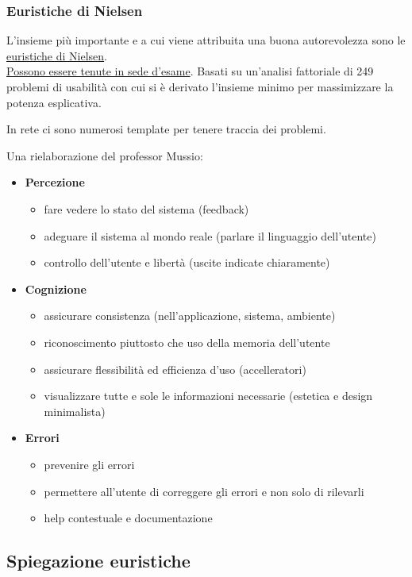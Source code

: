 \documentclass[11pt,a4paper]{book}
\begin{document}
\subsubsection{Euristiche di Nielsen}
L'insieme più importante e a cui viene attribuita una buona autorevolezza sono le \href{https://www.neurowebdesign.it/it/alla-scoperta-delle-10-euristiche-di-nielsen/}{euristiche di Nielsen}. \\\underline{Possono essere tenute in sede d'esame}.
Basati su un'analisi fattoriale di 249 problemi di usabilità con cui si è derivato l'insieme minimo per massimizzare la potenza esplicativa.

In rete ci sono numerosi template per tenere traccia dei problemi.

Una rielaborazione del professor Mussio:
\begin{itemize}
	\item[] \textbf{Percezione}
	\begin{itemize}
		\item fare vedere lo stato del sistema (feedback)
		\item adeguare il sistema al mondo reale (parlare il linguaggio dell'utente)
		\item controllo dell'utente e libertà (uscite indicate chiaramente)
	\end{itemize}
	\item[] \textbf{Cognizione}
	\begin{itemize}
		\item assicurare consistenza (nell'applicazione, sistema, ambiente)
		\item riconoscimento piuttosto che uso della memoria dell'utente
		\item assicurare flessibilità ed efficienza d'uso (accelleratori)
		\item visualizzare tutte e sole le informazioni necessarie (estetica e design minimalista)
	\end{itemize}
	\item[] \textbf{Errori}
	\begin{itemize}
		\item prevenire gli errori
		\item permettere all'utente di correggere gli errori e non solo di rilevarli
		\item help contestuale e documentazione
	\end{itemize}
\end{itemize}

\subsection{Spiegazione euristiche}
\end{document}

